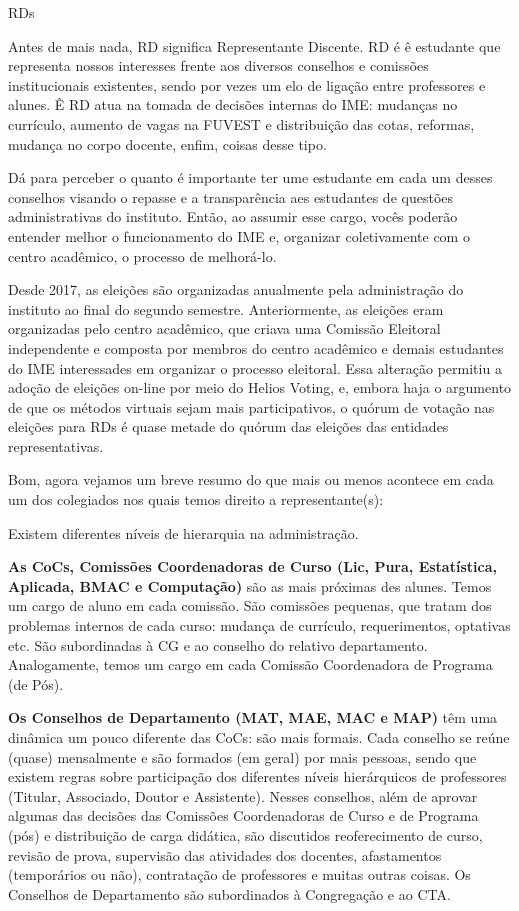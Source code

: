 \begin{subsecao}{RDs}

Antes de mais nada, RD significa Representante Discente. RD é ê estudante 
que representa nossos interesses frente aos diversos conselhos e comissões 
institucionais existentes, sendo por vezes um elo de ligação entre professores 
e alunes. Ê RD atua na tomada de decisões internas do IME: mudanças no currículo, 
aumento de vagas na FUVEST e distribuição das cotas, reformas, mudança no corpo 
docente, enfim, coisas desse tipo.

Dá para perceber o quanto é importante ter ume estudante em cada um desses conselhos 
visando o repasse e a transparência aes estudantes de questões administrativas do 
instituto. Então, ao assumir esse cargo, vocês poderão entender melhor o 
funcionamento do IME e, organizar coletivamente com o centro acadêmico, o processo de 
melhorá-lo.

Desde 2017, as eleições são organizadas anualmente pela administração do instituto 
ao final do segundo semestre. Anteriormente, as eleições eram organizadas pelo centro 
acadêmico, que criava uma Comissão Eleitoral independente e composta por membros do 
centro acadêmico e demais estudantes do IME interessades em organizar o processo eleitoral. 
Essa alteração permitiu a adoção de eleições on-line por meio do Helios Voting, e, embora 
haja o argumento de que os métodos virtuais sejam mais participativos, o quórum de votação 
nas eleições para RDs é quase metade do quórum das eleições das entidades representativas.

Bom, agora vejamos um breve resumo do que mais ou menos acontece em cada um dos 
colegiados nos quais temos direito a representante(s):

Existem diferentes níveis de hierarquia na administração.

{\bf As CoCs,
Comissões Coordenadoras de Curso (Lic, Pura, Estatística, Aplicada, BMAC e
Computação)} são as mais próximas des alunes. Temos um cargo de aluno em cada
comissão. São comissões pequenas, que tratam dos problemas internos de cada
curso: mudança de currículo, requerimentos, optativas etc. São subordinadas
à CG e ao conselho do relativo departamento. Analogamente, temos um cargo em cada
Comissão Coordenadora de Programa (de Pós).

{\bf Os Conselhos de Departamento (MAT, MAE, MAC e MAP)} têm uma dinâmica um
pouco diferente das CoCs: são mais formais. Cada conselho se reúne (quase)
mensalmente e são formados (em geral) por mais pessoas, sendo que existem
regras sobre participação dos diferentes níveis hierárquicos de
professores (Titular, Associado, Doutor e Assistente). Nesses conselhos, além
de aprovar algumas das decisões das Comissões Coordenadoras de Curso e de
Programa (pós) e distribuição de carga didática, são discutidos reoferecimento
de curso, revisão de prova, supervisão das atividades dos docentes,
afastamentos (temporários ou não), contratação de professores e muitas outras
coisas.
Os Conselhos de Departamento são subordinados à Congregação e ao CTA.


\end{subsecao}
